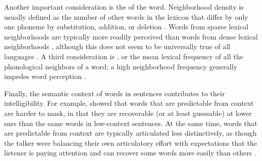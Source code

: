 Another important consideration is the  of the word.  Neighborhood density is usually defined as the number of other words in the lexicon that differ by only one phoneme by substitution, addition, or deletion \citep{LucePisoni1998}.  Words from sparse lexical neighborhoods are typically more readily perceived than words from dense lexical neighborhoods  \citep{VitevitchLuce1998, ZieglerEtAl2003}, although this does not seem to be universally true of all languages \citep{VitevitchRodriguez2005}.  A third consideration is , or the mean lexical frequency of all the phonological neighbors of a word; a high neighborhood frequency generally impedes word perception \citep{LucePisoni1998}.  


Finally, the semantic context of words in sentences contributes to their intelligibility.  For example, \citet{LewisEtAl1988} showed that words that are predictable from context are harder to mask, in that they are recoverable (or at least guessable) at lower \ac{snr}s than the same words in low-context sentences.  At the same time, words that are predictable from context are typically articulated less distinctively, as though the talker were balancing their own articulatory effort with expectations that the listener is paying attention and can recover some words more easily than others \citep{Wright2004a}.


